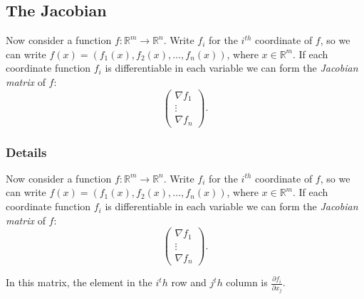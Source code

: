 \documentclass[12pt,a4paper]{article}
\theoremstyle{regla}
\theoremstyle{remark}
\theoremstyle{definition}
\theoremstyle{nonumberbreak}
\begin{document}
\subsection{The Jacobian}
\begin{fbox}
\begin{minipage}{0.97\textwidth}
Now consider a function 
$f:\mathbb{R}^m\to\mathbb{R}^n$. 
Write $f_i$ for the $i^{th}$ coordinate of $f$, so we can write $f(x)=(f_1(x),f_2(x),\ldots,f_n(x))$, 
where $x\in\mathbb{R}^m$. 
If each coordinate function $f_i$ is differentiable in each variable we can form the {\em Jacobian matrix} of $f$: 
$$\begin{pmatrix}\nabla f_1\\ \vdots \\ \nabla f_n\end{pmatrix}.$$

\end{minipage}
\end{fbox}
\subsubsection{Details}
Now consider a function 
$f:\mathbb{R}^m\to\mathbb{R}^n$. 
Write $f_i$ for the $i^{th}$ coordinate of $f$, so we can write $f(x)=(f_1(x),f_2(x),\ldots,f_n(x))$, 
where $x\in\mathbb{R}^m$. 
If each coordinate function $f_i$ is differentiable in each variable we can form the {\em Jacobian matrix} of $f$: 
$$\begin{pmatrix}\nabla f_1\\ \vdots \\ \nabla f_n\end{pmatrix}.$$


In this matrix, the element in the $i^th$ row and $j^th$ column is $\frac{\partial f_i}{\partial x_j}$.
\end{document}
